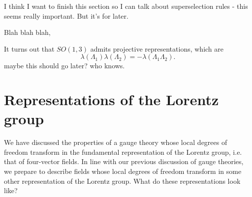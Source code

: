 \documentclass[main.tex]{subfiles}
\begin{document}
I think I want to finish this section so I can talk about superselection rules - this seems really important. But it's for later.

Blah blah blah,

It turns out that $SO(1,3)$ admits projective representations, which are
\[
\lambda(\Lambda_1) \lambda(\Lambda_2) = -\lambda(\Lambda_1 \Lambda_2).
\]
maybe this should go later? who knows.
\newpage

\section{Representations of the Lorentz group}
We have discussed the properties of a gauge theory whose local degrees of freedom transform in the fundamental representation of the Lorentz group, i.e. that of four-vector fields. In line with our previous discussion of gauge theories, we prepare to describe fields whose local degrees of freedom transform in some other representation of the Lorentz group. What do these representations look like?
\end{document}
